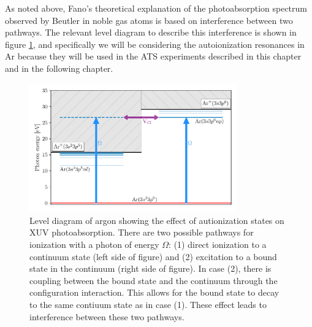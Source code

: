 As noted above, Fano's theoretical explanation of the photoabsorption spectrum observed by Beutler in noble gas atoms is based on interference between two pathways.  The relevant level diagram to describe this interference is shown in figure \ref{fig:fano_level_diagram}, and specifically we will be considering the autoionization resonances in Ar because they will be used in the ATS experiments described in this chapter and in the following chapter.


\begin{figure}
	\centering
	\includegraphics[width=0.8\textwidth]{figures/ATS/fano_level_diagram.pdf}
	\caption{Level diagram of argon showing the effect of autionization states on XUV photoabsorption. There are two possible pathways for ionization with a photon of energy $\Omega$: (1) direct ionization to a continuum state (left side of figure) and (2) excitation to a bound state in the continuum (right side of figure).  In case (2), there is coupling between the bound state and the continuum through the configuration interaction.  This allows for the bound state to decay to the same contiuum state as in case (1).  These effect leads to interference between these two pathways.}
	\label{fig:fano_level_diagram}
\end{figure}


